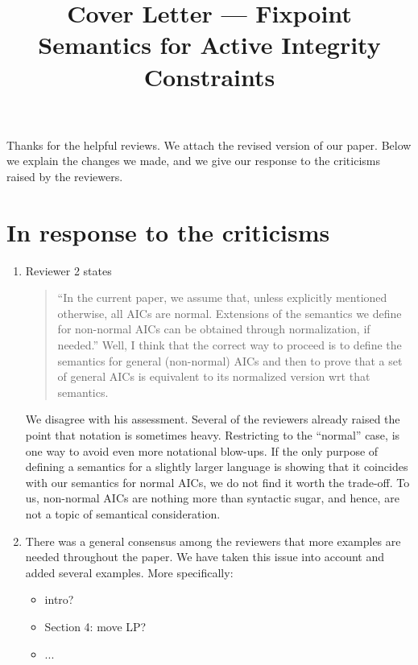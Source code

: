 \documentclass{article}
\title{Cover Letter --- Fixpoint Semantics for Active Integrity Constraints}
\begin{document}
\maketitle
Thanks for the helpful reviews. We attach the revised version of our paper. 
Below we explain the changes we made, and we give our response to the criticisms raised by the reviewers. 




\section{In response to the criticisms}
	\begin{enumerate}
	 \item Reviewer 2 states
	 \begin{quote}
	  ``In the current paper, we assume that, unless explicitly mentioned otherwise, all AICs are normal.
Extensions of the semantics we deﬁne for non-normal AICs can be obtained through normalization, if needed.''
Well, I think that the correct way to proceed is to define the semantics for general (non-normal) AICs and
then to prove that a set of general AICs is equivalent to its normalized version wrt that semantics.
	 \end{quote}
	 We disagree with his assessment. Several of the reviewers already raised the point that notation is sometimes heavy. Restricting to the ``normal'' case, is one way to avoid even more notational blow-ups. If the only purpose of defining a semantics for a slightly larger language is showing that it coincides with our semantics for normal AICs, we do not find it worth the trade-off. To us, non-normal AICs are nothing more than syntactic sugar, and hence, are not a topic of semantical consideration. 

	 \item There was a general consensus among the reviewers that more examples are needed throughout the paper. We have taken this issue into account and added several examples. More specifically:
	  \begin{itemize}
	  \item intro?
	  \item Section 4: move LP? 
	  \item ... 
	  \end{itemize}
	  

\end{enumerate}
\end{document}
